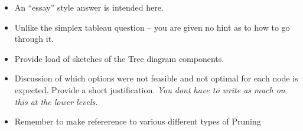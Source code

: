 \documentclass{beamer}
\begin{document}
	\begin{frame}
\begin{itemize}
\item An “essay” style answer is intended here. 
\item Unlike the simplex tableau question – you are given no hint as to how to go through it.
\item Provide load of sketches of the Tree diagram components.
\item Discussion of which options were not feasible and not optimal for each node is expected. Provide a short justification.
\textit{You dont have to write as much on this at the lower levels.}
\item Remember to make refererence to various different types of Pruning
\end{itemize}
\end{frame}
\end{document}
